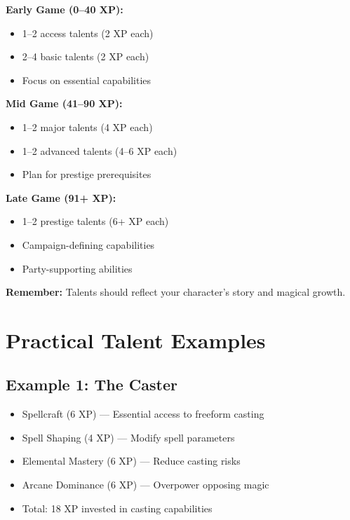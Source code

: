 \documentclass[11pt,twoside,openany]{book}
\begin{document}
\begin{tcolorbox}[colback=gray!5!white, colframe=gray!75!black, title=Talent Selection Guide, fonttitle=\bfseries,breakable]
\textbf{Early Game (0--40 XP):}
\begin{itemize}
\item 1--2 access talents (2 XP each)
\item 2--4 basic talents (2 XP each)
\item Focus on essential capabilities
\end{itemize}

\textbf{Mid Game (41--90 XP):}
\begin{itemize}
\item 1--2 major talents (4 XP each)
\item 1--2 advanced talents (4--6 XP each)
\item Plan for prestige prerequisites
\end{itemize}

\textbf{Late Game (91+ XP):}
\begin{itemize}
\item 1--2 prestige talents (6+ XP each)
\item Campaign-defining capabilities
\item Party-supporting abilities
\end{itemize}

\textbf{Remember:} Talents should reflect your character's story and magical growth.
\end{tcolorbox}

\section*{Practical Talent Examples} 

\subsection*{Example 1: The Caster}

\begin{itemize}
\item Spellcraft (6 XP) --- Essential access to freeform casting
\item Spell Shaping (4 XP) --- Modify spell parameters
\item Elemental Mastery (6 XP) --- Reduce casting risks
\item Arcane Dominance (6 XP) --- Overpower opposing magic
\item Total: 18 XP invested in casting capabilities
\end{itemize}
\end{document}
